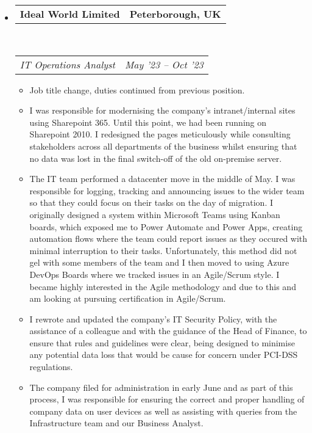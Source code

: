 \documentclass[10pt,a4paper]{article}
\makeatletter
\newcommand{\headerrow}[2]
{\begin{tabular*}{\linewidth}{l@{\extracolsep{\fill}}r}
	#1 &
	#2 \\
\end{tabular*}}
\makeatother
\begin{document}
\begin{itemize}
	\parskip=0.1em

	\item
	\headerrow
		{\textbf{Ideal World Limited}}
		{\textbf{Peterborough, UK}}
	\\
	\headerrow
		{\emph{IT Operations Analyst}}
		{\emph{May '23 -- Oct '23}}
	\begin{itemize}
		\item Job title change, duties continued from previous position.
		\item I was responsible for modernising the company's intranet/internal sites using Sharepoint 365. Until this point, we had been running on Sharepoint 2010. I redesigned the pages meticulously while consulting stakeholders across all departments of the business whilst ensuring that no data was lost in the final switch-off of the old on-premise server.
		\item The IT team performed a datacenter move in the middle of May. I was responsible for logging, tracking and announcing issues to the wider team so that they could focus on their tasks on the day of migration. I originally designed a system within Microsoft Teams using Kanban boards, which exposed me to Power Automate and Power Apps, creating automation flows where the team could report issues as they occured with minimal interruption to their tasks. Unfortunately, this method did not gel with some members of the team and I then moved to using Azure DevOps Boards where we tracked issues in an Agile/Scrum style. I became highly interested in the Agile methodology and due to this and am looking at pursuing certification in Agile/Scrum.
		\item I rewrote and updated the company's IT Security Policy, with the assistance of a colleague and with the guidance of the Head of Finance, to ensure that rules and guidelines were clear, being designed to minimise any potential data loss that would be cause for concern under PCI-DSS regulations.
		\item The company filed for administration in early June and as part of this process, I was responsible for ensuring the correct and proper handling of company data on user devices as well as assisting with queries from the Infrastructure team and our Business Analyst.
	\end{itemize}


\end{itemize}
\end{document}
